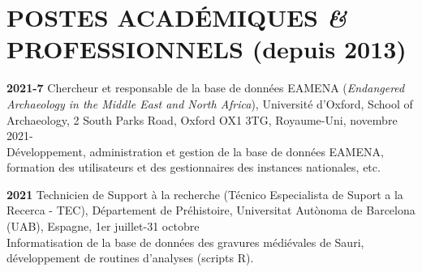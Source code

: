 \documentclass{article}
\newcommand{\fr}[1]{#1}       %
\newcommand{\en}[1]{}     %
\begin{document}
\section{\fr{POSTES ACADÉMIQUES \textit{\&} PROFESSIONNELS (depuis 2013)}\en{ACADEMIC \textit{\&} PROFESSIONAL POSITIONS (since 2013)}}

\textbf{2021-7} 
\fr{Chercheur et responsable de la base de données EAMENA (\textit{Endangered Archaeology in the Middle East and North Africa}), Université d'Oxford, School of Archaeology, 2 South Parks Road, Oxford OX1 3TG, Royaume-Uni, novembre 2021-\\
\hspace*{0.5cm} Développement, administration et gestion de la base de données EAMENA, formation des utilisateurs et des gestionnaires des instances nationales, etc.}
\en{Researcher and Database Manager for EAMENA (\textit{Endangered Archaeology in the Middle East and North Africa}), University of Oxford, School of Archaeology, 2 South Parks Road, Oxford OX1 3TG, United Kingdom, November 2021-\\
\hspace*{0.5cm} Development, administration, and management of the EAMENA database, training of users and managers of national instances, etc.}

\smallbreak
\textbf{2021} 
\fr{Technicien de Support à la recherche (Técnico Especialista de Suport a la Recerca - TEC), Département de Préhistoire, Universitat Autònoma de Barcelona (UAB), Espagne, 1er juillet-31 octobre \\
\hspace*{0.5cm} Informatisation de la base de données des gravures médiévales de Sauri, développement de routines d'analyses (scripts R).}
\en{Research Support Technician (Técnico Especialista de Suport a la Recerca - TEC), Department of Prehistory, Universitat Autònoma de Barcelona (UAB), Spain, July 1 - October 31 \\
\hspace*{0.5cm} Computerization of the database of medieval engravings from Sauri, development of analysis routines (R scripts).}
\end{document}
